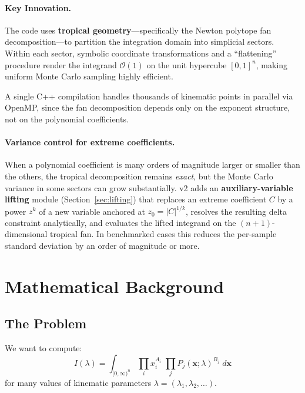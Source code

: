 \documentclass[11pt,a4paper]{article}
\begin{document}
\paragraph{Key Innovation.} The code uses \textbf{tropical geometry}---specifically the Newton polytope fan decomposition---to partition the integration domain into simplicial sectors. Within each sector, symbolic coordinate transformations and a ``flattening'' procedure render the integrand $\mathcal{O}(1)$ on the unit hypercube $[0,1]^n$, making uniform Monte Carlo sampling highly efficient.

A single C++ compilation handles thousands of kinematic points in parallel via OpenMP, since the fan decomposition depends only on the exponent structure, not on the polynomial coefficients.

\paragraph{Variance control for extreme coefficients.} When a polynomial coefficient is many orders of magnitude larger or smaller than the others, the tropical decomposition remains \emph{exact}, but the Monte Carlo variance in some sectors can grow substantially. v2 adds an \textbf{auxiliary-variable lifting} module (Section~\ref{sec:lifting}) that replaces an extreme coefficient $C$ by a power $z^k$ of a new variable anchored at $z_0 = |C|^{1/k}$, resolves the resulting delta constraint analytically, and evaluates the lifted integrand on the $(n{+}1)$-dimensional tropical fan. In benchmarked cases this reduces the per-sample standard deviation by an order of magnitude or more.

\section{Mathematical Background}

\subsection{The Problem}

We want to compute:
\begin{equation}
I(\lambda) = \int_{[0,\infty)^n} \prod_i x_i^{A_i} \;\prod_j P_j(\mathbf{x};\lambda)^{B_j} \; d\mathbf{x}
\end{equation}
for many values of kinematic parameters $\lambda = (\lambda_1, \lambda_2, \ldots)$.
\end{document}
